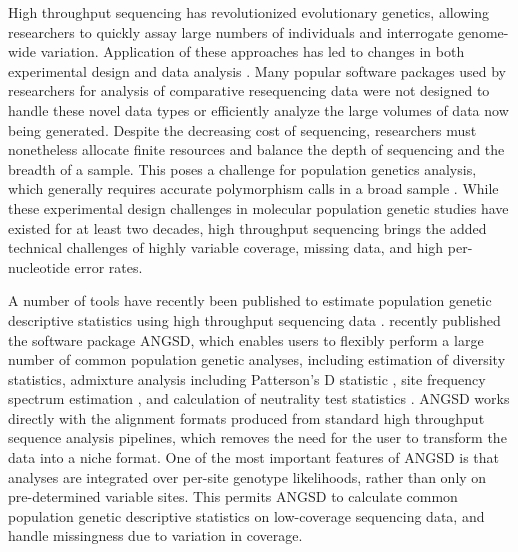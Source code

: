 \documentclass[10pt,a4paper]{article}
\begin{document}
High throughput sequencing has revolutionized evolutionary genetics, allowing researchers to quickly assay large numbers of individuals and interrogate genome-wide variation. 
Application of these approaches has led to changes in both experimental design and data analysis \citep{ekblom2011applications}. 
Many popular software packages used by researchers for analysis of comparative resequencing data \citep[see][]{excoffier2006computer} were not designed to handle these novel data types or efficiently analyze the large volumes of data now being generated. 
Despite the decreasing cost of sequencing, researchers must nonetheless allocate finite resources and balance the depth of sequencing and the breadth of a sample. 
This poses a challenge for population genetics analysis, which generally requires accurate polymorphism calls in a broad sample \citep{pluzhnikov1996optimal, felsenstein2006accuracy}. 
While these experimental design challenges in molecular population genetic studies have existed for at least two decades, high throughput sequencing brings the added technical challenges of highly variable coverage, missing data, and high per-nucleotide error rates.

A number of tools have recently been published to estimate population genetic descriptive statistics using high throughput sequencing data \citep{garrigan2013popbam, purcell2007plink, danecek2011variant, hutter2006genome}. 
 \citet{korneliussen2014angsd} recently published the software package ANGSD, which enables users to flexibly perform a large number of common population genetic analyses, including estimation of diversity statistics, admixture analysis including Patterson's D statistic \citep{Durand:2011jd}, site frequency spectrum estimation \citep{pmid22911679}, and calculation of neutrality test statistics \citep{korneliussen_calculation_2013}. 
ANGSD works directly with the alignment formats produced from standard high throughput sequence analysis pipelines, which removes the need for the user to transform the data into a niche format. 
One of the most important features of ANGSD is that analyses are integrated over per-site genotype likelihoods, rather than only on pre-determined variable sites. 
This permits ANGSD to calculate common population genetic descriptive statistics on low-coverage sequencing data, and handle missingness due to variation in coverage. 
\end{document}
